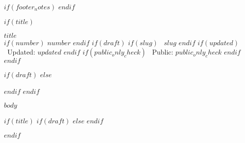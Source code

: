 
\fancyfoot[LE,RO]{}
$if(footer_notes)$
$endif$

$if(title)$
\begin{center}
  {\LARGE\bfseries $title$}\\[6pt]
  {\small
    $if(number)$ $number$ $endif$
    $if(draft)$
    $if(slug)$ \textbullet\ $slug$ $endif$
    $if(updated)$ \textbullet\ Updated: $updated$ $endif$
    $if(public_only_check)$ \textbullet\ Public: $public_only_check$ $endif$
    $endif$
  }
\end{center}
$if(draft)$
$else$
\begingroup
  \setcounter{tocdepth}{0}
  \let\oldsubsection\subsection
  \renewcommand{\subsection}[1]{\oldsubsection*{##1}}
$endif$
$endif$

$body$

$if(title)$
$if(draft)$
$else$
\endgroup
$endif$

\clearpage

$endif$
